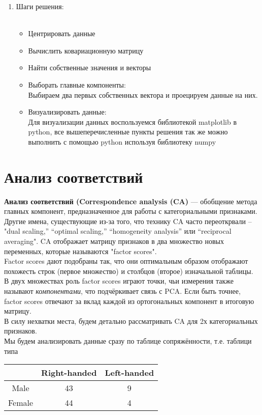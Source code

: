 \begin{enumerate}
   \item Шаги решения:\\\
   \begin{itemize} 
       \item Центрировать данные \\
       \item Вычислить ковариационную матрицу \\
       \item Найти собственные значения и векторы \\ 
       \item Выборать главные компоненты: \\
        Выбираем два первых собственных вектора и проецируем данные на них.
       \item Визуализировать данные: \\
       Для визуализации данных воспользуемся библиотекой matplotlib в python, все вышеперечисленные пункты решения так же можно выполнить с помощью python используя библиотеку numpy       
   \end{itemize}
\end{enumerate}

\section{Анализ соответствий}
\textbf{Анализ соответствий (Correspondence analysis (CA)} — обобщение метода главных компонент, предназначенное для работы с
категориальными признаками. Другие имена, существующие из-за того, что технику CA часто переоткрвали -- "dual scaling,” “optimal scaling,” “homogeneity analysis” или “reciprocal averaging". CA отображает матрицу признаков в два множество новых переменных, которые называются "factor scores".\\
Factor scores  дают подобраны так, что они оптимальным образом отображают похожесть строк (первое множество) и столбцов (второе) изначальной таблицы. В двух множествах роль factor scores играют точки, чьи  измерения также называют \textit{компонентами}, что подчёркивает связь с PCA. Если быть точнее, factor scores отвечают за вклад каждой из ортогональных компонент в итоговую матрицу.\\
В силу нехватки места, будем детально рассматривать CA для 2х категориальных признаков.\\
Мы будем анализировать данные сразу по таблице сопряжённости, т.е. таблици типа 
\begin{table}[H]\centering
\begin{tabular}{|c|c|c|}
\hline  & Right-handed & Left-handed  \\
\hline Male & 43 & 9 \\
\hline Female & 44 & 4  \\
\hline
\end{tabular}
\end{table}
